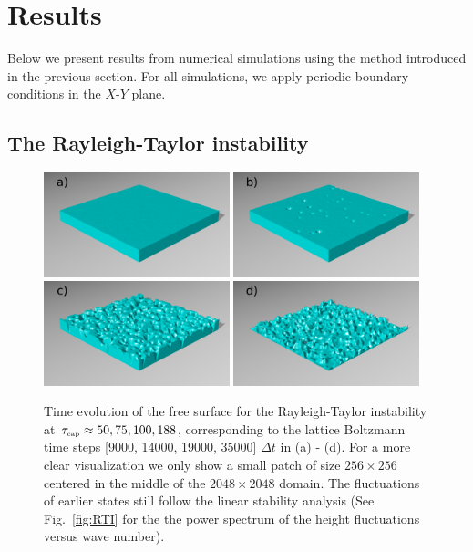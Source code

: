 \section{Results}\label{sec:results}
Below we present results from numerical simulations using the method introduced in the previous section. 
For all simulations, we apply periodic boundary conditions in the $X$-$Y$ plane.
\subsection{The Rayleigh-Taylor instability}

\begin{figure}
    \includegraphics[width=0.48\textwidth]{graphics/Fig_2_1_rti_renders_a).png}
    \includegraphics[width=0.48\textwidth]{graphics/Fig_2_2_rti_renders_b).png}
    \includegraphics[width=0.48\textwidth]{graphics/Fig_2_3_rti_renders_c).png}
    \includegraphics[width=0.48\textwidth]{graphics/Fig_2_4_rti_renders_d).png}
  \caption{Time evolution of the free surface for the Rayleigh-Taylor instability at $\tau_{\mbox{\tiny{cap}}}\approx 50, 75, 100, 188$, corresponding to the lattice Boltzmann time steps [9000, 14000, 19000, 35000] $\Delta t$ in (a) - (d). For a more clear visualization we only show a small patch of size $256\times256$ centered in the middle of the $2048\times 2048$ domain. The fluctuations of earlier states still follow the linear stability analysis (See Fig.~\ref{fig:RTI} for the the power spectrum of the  height fluctuations versus wave number).}
  \label{fig:RTI_evolution}
\end{figure}


